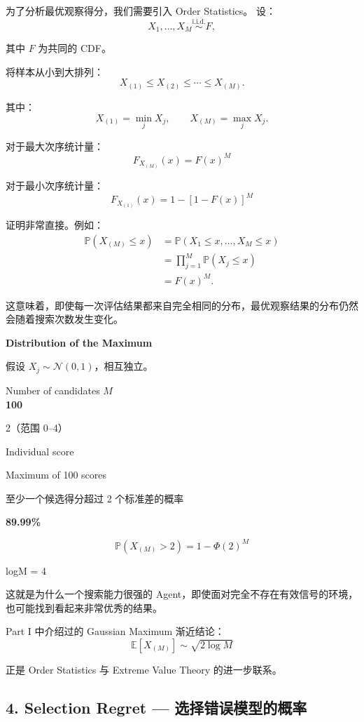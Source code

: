 为了分析最优观察得分，我们需要引入 Order Statistics。 设：
\[X_1,\ldots,X_M\overset{\mathrm{i.i.d.}}{\sim}F,\]

其中 \(F\) 为共同的 CDF。

将样本从小到大排列：
\[X_{(1)}\leq X_{(2)}
\leq\cdots\leq X_{(M)}.\]

其中：
\[X_{(1)}=\min_j X_j,
\qquad
X_{(M)}=\max_j X_j.\]

对于最大次序统计量：
\[\boxed{
F_{X_{(M)}}(x)=F(x)^M
}\]

对于最小次序统计量：
\[\boxed{
F_{X_{(1)}}(x)=1-[1-F(x)]^M
}\]

证明非常直接。例如：
\[\begin{aligned}
\mathbb P(X_{(M)}\leq x)
&=\mathbb P(X_1\leq x,\ldots,X_M\leq x)\\
&=\prod_{j=1}^{M}\mathbb P(X_j\leq x)\\
&=F(x)^M.
\end{aligned}\]

这意味着，即使每一次评估结果都来自完全相同的分布，最优观察结果的分布仍然会随着搜索次数发生变化。

\textbf{Distribution of the Maximum}

假设 \(X_j\sim\mathcal N(0,1)\)，相互独立。

Number of candidates \(M\)\\
\textbf{100}

2（范围 0--4）


Individual score

Maximum of 100 scores

至少一个候选得分超过 2 个标准差的概率

\textbf{89.99\%}

\[\mathbb P(X_{(M)}>2)=1-\Phi(2)^M\]

logM = 4


这就是为什么一个搜索能力很强的 Agent，即使面对完全不存在有效信号的环境，也可能找到看起来非常优秀的结果。

Part I 中介绍过的 Gaussian Maximum 渐近结论：
\[\mathbb E[X_{(M)}]
\sim\sqrt{2\log M}\]

正是 Order Statistics 与 Extreme Value Theory 的进一步联系。

\hypertarget{part-2-16-0001-selection-regret-ux9009ux62e9ux9519ux8befux6a21ux578bux7684ux6982ux7387}{%
\subsection{4. Selection Regret --- 选择错误模型的概率}\label{part-2-16-0001-selection-regret-ux9009ux62e9ux9519ux8befux6a21ux578bux7684ux6982ux7387}}

